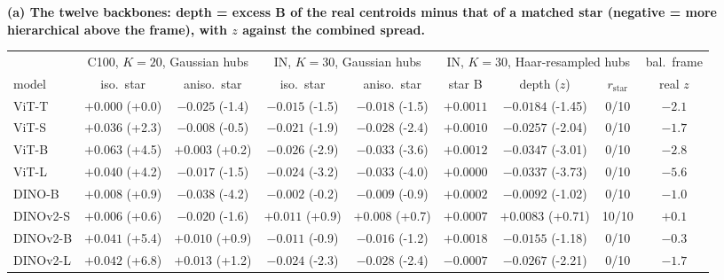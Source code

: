 \begin{table}[tbp]
\centering
\scriptsize
\setlength{\tabcolsep}{2.2pt}
\begingroup
\noindent\textbf{(a) The twelve backbones: depth = excess B of the real centroids minus that of a matched star (negative = more hierarchical above the frame), with $z$ against the combined spread.}\par\vspace{1.5pt}
\setlength{\tabcolsep}{1.8pt}
\begin{tabular}{lcc@{\hspace{5pt}}cc@{\hspace{5pt}}ccc@{\hspace{5pt}}c}
\toprule
 & \multicolumn{2}{c}{C100, $K{=}20$, Gaussian hubs} & \multicolumn{2}{c}{IN, $K{=}30$, Gaussian hubs} & \multicolumn{3}{c}{IN, $K{=}30$, Haar-resampled hubs} & bal.\ frame \\
\cmidrule(lr){2-3}\cmidrule(lr){4-5}\cmidrule(lr){6-8}\cmidrule(lr){9-9}
model & iso.\ star & aniso.\ star & iso.\ star & aniso.\ star & star B & depth ($z$) & $r_{\text{star}}$ & real $z$ \\
\midrule
ViT-T & $+0.000$ (+0.0) & $-0.025$ (-1.4) & $-0.015$ (-1.5) & $-0.018$ (-1.5) & $+0.0011$ & $-0.0184$ (-1.45) & 0/10 & $-2.1$ \\
ViT-S & $+0.036$ (+2.3) & $-0.008$ (-0.5) & $-0.021$ (-1.9) & $-0.028$ (-2.4) & $+0.0010$ & $-0.0257$ (-2.04) & 0/10 & $-1.7$ \\
ViT-B & $+0.063$ (+4.5) & $+0.003$ (+0.2) & $-0.026$ (-2.9) & $-0.033$ (-3.6) & $+0.0012$ & $-0.0347$ (-3.01) & 0/10 & $-2.8$ \\
ViT-L & $+0.040$ (+4.2) & $-0.017$ (-1.5) & $-0.024$ (-3.2) & $-0.033$ (-4.0) & $+0.0000$ & $-0.0337$ (-3.73) & 0/10 & $-5.6$ \\
\midrule
DINO-B & $+0.008$ (+0.9) & $-0.038$ (-4.2) & $-0.002$ (-0.2) & $-0.009$ (-0.9) & $+0.0002$ & $-0.0092$ (-1.02) & 0/10 & $-1.0$ \\
DINOv2-S & $+0.006$ (+0.6) & $-0.020$ (-1.6) & $+0.011$ (+0.9) & $+0.008$ (+0.7) & $+0.0007$ & $+0.0083$ (+0.71) & 10/10 & $+0.1$ \\
DINOv2-B & $+0.041$ (+5.4) & $+0.010$ (+0.9) & $-0.011$ (-0.9) & $-0.016$ (-1.2) & $+0.0018$ & $-0.0155$ (-1.18) & 0/10 & $-0.3$ \\
DINOv2-L & $+0.042$ (+6.8) & $+0.013$ (+1.2) & $-0.024$ (-2.3) & $-0.028$ (-2.4) & $-0.0007$ & $-0.0267$ (-2.21) & 0/10 & $-1.7$ \\

\end{tabular}
\end{table}
